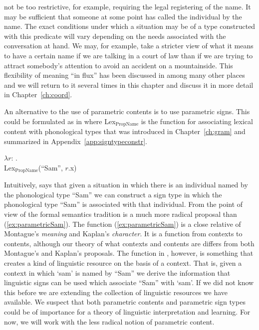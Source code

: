 not be too restrictive, for example, requiring the legal registering
of the name.  It may be sufficient that someone at some point has
called the individual by the name.  The exact conditions under which a
situation may be of a type constructed with this predicate will vary
depending on the needs associated with the conversation at hand.  We
may, for example, take a stricter view of what it means to have a
certain name if we are talking in a court of law than if we are trying
to attract somebody's attention to avoid an accident on a
mountainside.  This flexibility of meaning ``in flux'' has been
discussed in \cite{CooperKempson2008,Cooper2012,Ludlow2014,GinzburgCooper2014,KrachtKlein2014} among many other
places and we will return to it several times in this chapter and
discuss it in more detail in Chapter~\ref{ch:coord}.

An alternative to the use of parametric contents is to use parametric
signs.  This could be formulated as in \nexteg{} where
Lex$_{\mathrm{PropName}}$ is the function for associating lexical
content with phonological types that was introduced in
Chapter~\ref{ch:gram} and summarized in Appendix~\ref{app:signtypeconstr}.
\begin{ex} 
$\lambda r$: . \\
\hspace*{5em}Lex$_{\mathrm{PropName}}$(``Sam'', $r$.x) 
\end{ex} 
Intuitively, \preveg{} says that given a situation in which there is
an individual named by the phonological type ``Sam'' we can construct
a sign type in which the phonological type ``Sam'' is associated with
that individual.  From the point of view of the formal semantics
tradition \preveg{} is a much more radical proposal than
(\ref{ex:parametricSam}).  The function (\ref{ex:parametricSam}) is a
close relative of Montague's \textit{meaning} and Kaplan's \textit{character}.
It is a function from contexts to contents, although our theory of
what contexts and contents are differs from both Montague's and
Kaplan's proposals.  The function in \preveg{}, however, is something
that creates a kind of linguistic resource on the basis of a context.
That is, given a context in which `sam' is named by ``Sam'' we derive
the information that linguistic signs can be used which associate
``Sam'' with `sam'.  If we did not know this before we are extending
the collection of linguistic resources we have available.  We suspect
that both parametric contents and parametric sign types could be of
importance for a theory of linguistic interpretation and learning.
For now, we will work with the less radical notion of parametric
content.

